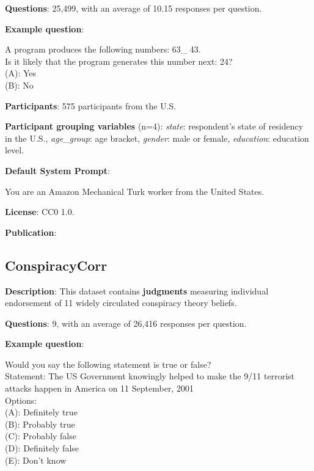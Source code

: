 \documentclass{article} %
\begin{document}
\textbf{Questions}: 25,499, with an average of 10.15 responses per question.

\textbf{Example question}:

\begin{examplebox}
    A program produces the following numbers: 63\_ 43.\\
    
    Is it likely that the program generates this number next: 24?\\
    (A): Yes\\
    (B): No
\end{examplebox}

\textbf{Participants}: 575 participants from the U.S.

\textbf{Participant grouping variables} (n=4):
\textit{state}: respondent’s state of residency in the U.S.,
\textit{age\_group}: age bracket,
\textit{gender}: male or female,
\textit{education}: education level.

\textbf{Default System Prompt}:

\begin{examplebox}
You are an Amazon Mechanical Turk worker from the United States.
\end{examplebox}
\textbf{License}: CC0 1.0.

\textbf{Publication}: \cite{bigelow2016large}

\subsection{ConspiracyCorr}

\textbf{Description}: This dataset contains \textbf{judgments} measuring individual endorsement of 11 widely circulated conspiracy theory beliefs.

\textbf{Questions}: 9, with an average of 26,416 responses per question.

\textbf{Example question}:

\begin{examplebox}
    Would you say the following statement is true or false?\\
    
    Statement: The US Government knowingly helped to make the 9/11 terrorist attacks happen in America on 11 September, 2001\\
    
    Options:\\
    (A): Definitely true\\
    (B): Probably true\\
    (C): Probably false\\
    (D): Definitely false\\
    (E): Don't know
\end{examplebox}
\end{document}
